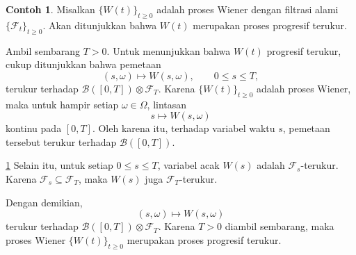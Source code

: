 \documentclass[aspectratio=169,11pt]{beamer}
\theoremstyle{definition}
\newtheorem{contoh}{Contoh}
\newcommand{\myref}[1]{\hyperref[#1]{\nameCref{#1} \ref*{#1}}}
\begin{document}
\begin{frame}{\insertsection}{\insertsubsection}
  \begin{contoh}\label{cth:5.8}
    Misalkan $\{W(t)\}_{t\geq 0}$ adalah proses Wiener dengan filtrasi alami
    $\{\mathcal{F}_t\}_{t\geq 0}$. Akan ditunjukkan bahwa $W(t)$ merupakan proses
    progresif terukur.

    Ambil sembarang $T>0$. Untuk menunjukkan bahwa $W(t)$ progresif terukur, cukup
    ditunjukkan bahwa pemetaan
    \[
      (s,\omega)\mapsto W(s,\omega),
      \qquad 0\leq s\leq T,
    \]
    terukur terhadap
    $
      \mathcal{B}([0,T])\otimes\mathcal{F}_T.
    $
    Karena $\{W(t)\}_{t\geq 0}$ adalah proses Wiener, maka untuk hampir setiap
    $\omega\in\Omega$, lintasan
    \[
      s\mapsto W(s,\omega)
    \]
    kontinu pada $[0,T]$. Oleh karena itu, terhadap variabel waktu $s$, pemetaan
    tersebut terukur terhadap $\mathcal{B}([0,T])$.
  \end{contoh}
\end{frame}

\begin{frame}{\insertsection}{\insertsubsection}
  \begin{exampleblock}{\myref{cth:5.8}}
    Selain itu, untuk setiap $0\leq s\leq T$, variabel acak $W(s)$ adalah
    $\mathcal{F}_s$-terukur. Karena $\mathcal{F}_s\subseteq \mathcal{F}_T$, maka
    $W(s)$ juga $\mathcal{F}_T$-terukur.

    Dengan demikian,
    \[
      (s,\omega)\mapsto W(s,\omega)
    \]
    terukur terhadap $\mathcal{B}([0,T])\otimes\mathcal{F}_T$. Karena $T>0$
    diambil sembarang, maka proses Wiener $\{W(t)\}_{t\geq 0}$ merupakan proses
    progresif terukur.
  \end{exampleblock}
\end{frame}
\end{document}
